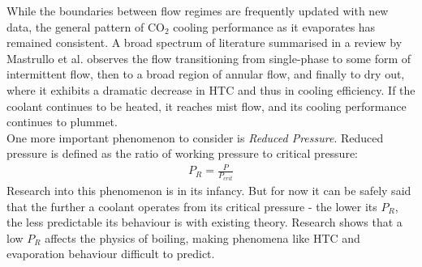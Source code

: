 \documentclass{report}
\begin{document}
While the boundaries between flow regimes are frequently updated with new data, the general pattern of CO$_2$ cooling performance as it evaporates has remained consistent. A broad spectrum of literature summarised in a review by Mastrullo et al.\cite{Mastrullo 2010} observes the flow transitioning from single-phase to some form of intermittent flow, then to a broad region of annular flow, and finally to dry out, where it exhibits a dramatic decrease in HTC and thus in cooling efficiency. If the coolant continues to be heated, it reaches mist flow, and its cooling performance continues to plummet. 
\\
One more important phenomenon to consider is \textit{Reduced Pressure}. Reduced pressure is defined as the ratio of working pressure to critical pressure:
\begin{eqnarray}
P_R=\frac{P}{P_{crit}}
\end{eqnarray}
Research into this phenomenon is in its infancy. But for now it can be safely said that the further a coolant operates from its critical pressure - the lower its $P_R$, the less predictable its behaviour is with existing theory. \cite{Mastrullo 2012}\cite{Mastrullo 2012b} Research shows that a low $P_R$ affects the physics of boiling, making phenomena like HTC and evaporation behaviour difficult to predict.
\FloatBarrier
\end{document}
